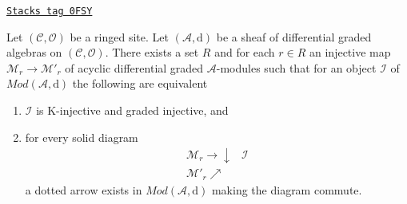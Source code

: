 \begin{lemma}
\label{sdga-lemma-better-set-of-monos}
\href{https://stacks.math.columbia.edu/tag/0FSY}{\texttt{Stacks tag 0FSY}}

Let $(\mathcal{C}, \mathcal{O})$ be a ringed site.
Let $(\mathcal{A}, \text{d})$
be a sheaf of differential graded algebras on $(\mathcal{C}, \mathcal{O})$.
There exists a set $R$ and for each $r \in R$ an injective map
$\mathcal{M}_r \to \mathcal{M}'_r$ of
acyclic differential graded $\mathcal{A}$-modules
such that for an object $\mathcal{I}$ of $\textit{Mod}(\mathcal{A}, \text{d})$
the following are equivalent
\begin{enumerate}
\item $\mathcal{I}$ is K-injective and graded injective, and
\item for every solid diagram
$$
\begin{array}{cc}\mathcal{M}_r \longrightarrow\downarrow & \mathcal{I} \\ \mathcal{M}'_r \nearrow & \end{array}
$$
a dotted arrow exists in $\textit{Mod}(\mathcal{A}, \text{d})$
making the diagram commute.
\end{enumerate}
\end{lemma}

